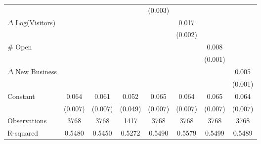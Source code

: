 {\begin{tabular}{l*{7}{c}}
                    &                     &                     &                     &     (0.003)         &                     &                     &                     \\
$\Delta$ Log(Visitors)&                     &                     &                     &                     &       0.017\sym{***}&                     &                     \\
                    &                     &                     &                     &                     &     (0.002)         &                     &                     \\
$\#$ Open           &                     &                     &                     &                     &                     &       0.008\sym{***}&                     \\
                    &                     &                     &                     &                     &                     &     (0.001)         &                     \\
$\Delta$ New Business&                     &                     &                     &                     &                     &                     &       0.005\sym{***}\\
                    &                     &                     &                     &                     &                     &                     &     (0.001)         \\
Constant            &       0.064\sym{***}&       0.061\sym{***}&       0.052         &       0.065\sym{***}&       0.064\sym{***}&       0.065\sym{***}&       0.064\sym{***}\\
                    &     (0.007)         &     (0.007)         &     (0.049)         &     (0.007)         &     (0.007)         &     (0.007)         &     (0.007)         \\
\midrule
Observations        &        3768         &        3768         &        1417         &        3768         &        3768         &        3768         &        3768         \\
R-squared           &      0.5480         &      0.5450         &      0.5272         &      0.5490         &      0.5579         &      0.5499         &      0.5489         \\
\bottomrule
\end{tabular}
}
